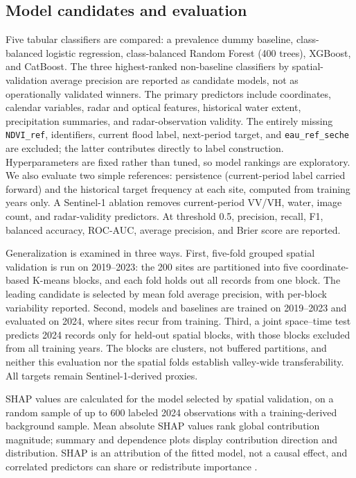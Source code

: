 \documentclass[pdflatex,sn-mathphys,Numbered]{sn-jnl}
\begin{document}
\subsection{Model candidates and evaluation}
Five tabular classifiers are compared: a prevalence dummy baseline, class-balanced logistic regression, class-balanced Random Forest (400 trees), XGBoost, and CatBoost. The three highest-ranked non-baseline classifiers by spatial-validation average precision are reported as candidate models, not as operationally validated winners. The primary predictors include coordinates, calendar variables, radar and optical features, historical water extent, precipitation summaries, and radar-observation validity. The entirely missing \texttt{NDVI\_ref}, identifiers, current flood label, next-period target, and \texttt{eau\_ref\_seche} are excluded; the latter contributes directly to label construction. Hyperparameters are fixed rather than tuned, so model rankings are exploratory. We also evaluate two simple references: persistence (current-period label carried forward) and the historical target frequency at each site, computed from training years only. A Sentinel-1 ablation removes current-period VV/VH, water, image count, and radar-validity predictors. At threshold 0.5, precision, recall, F1, balanced accuracy, ROC-AUC, average precision, and Brier score are reported.

Generalization is examined in three ways. First, five-fold grouped spatial validation is run on 2019--2023: the 200 sites are partitioned into five coordinate-based K-means blocks, and each fold holds out all records from one block. The leading candidate is selected by mean fold average precision, with per-block variability reported. Second, models and baselines are trained on 2019--2023 and evaluated on 2024, where sites recur from training. Third, a joint space--time test predicts 2024 records only for held-out spatial blocks, with those blocks excluded from all training years. The blocks are clusters, not buffered partitions, and neither this evaluation nor the spatial folds establish valley-wide transferability. All targets remain Sentinel-1-derived proxies.

SHAP values are calculated for the model selected by spatial validation, on a random sample of up to 600 labeled 2024 observations with a training-derived background sample. Mean absolute SHAP values rank global contribution magnitude; summary and dependence plots display contribution direction and distribution. SHAP is an attribution of the fitted model, not a causal effect, and correlated predictors can share or redistribute importance \cite{lundberg2017}.
\end{document}
